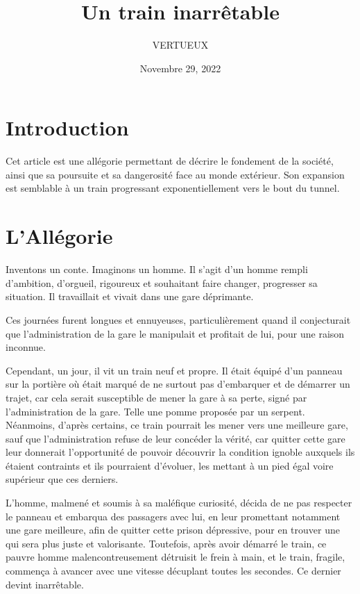 \documentclass[]{cls/tools}
\begin{document}
\title{Un train inarrêtable}

\author{VERTUEUX}
\date{Novembre 29, 2022}

\maketitle

\section*{Introduction}

Cet article est une allégorie permettant de décrire le fondement de la société, ainsi que sa poursuite et sa 
dangerosité face au monde extérieur. Son expansion est semblable à un train progressant exponentiellement vers le bout du tunnel.

\section*{L'Allégorie}

Inventons un conte. Imaginons un homme. Il s'agit d'un homme rempli d'ambition, d'orgueil, rigoureux et 
souhaitant faire changer, progresser sa situation. Il travaillait et vivait dans une gare déprimante. 

Ces journées furent longues et ennuyeuses, particulièrement quand il conjecturait que l'administration de la gare le 
manipulait et profitait de lui, pour une raison inconnue.

Cependant, un jour, il vit un train neuf et propre. Il était équipé d'un panneau sur la portière où était marqué de ne surtout pas 
d'embarquer et de démarrer un trajet, car cela serait susceptible de mener la gare à sa perte, signé par l'administration de la gare. Telle une pomme 
proposée par un serpent. Néanmoins, d'après certains, ce train pourrait les mener vers une meilleure gare, sauf que 
l'administration refuse de leur concéder la vérité, car quitter cette gare leur donnerait l'opportunité de pouvoir découvrir 
la condition ignoble auxquels ils étaient contraints et ils pourraient d'évoluer, les mettant à un pied égal voire supérieur que ces derniers.   

L'homme, malmené et soumis à sa maléfique curiosité, décida de ne pas respecter le panneau 
et embarqua des passagers avec lui, en leur promettant notamment une gare meilleure, afin de quitter 
cette prison dépressive, pour en trouver une qui sera plus juste et valorisante. Toutefois, après 
avoir démarré le train, ce pauvre homme malencontreusement détruisit le frein à main, et le train, fragile, 
commença à avancer avec une vitesse décuplant toutes les secondes. Ce dernier devint inarrêtable. 
\end{document}
